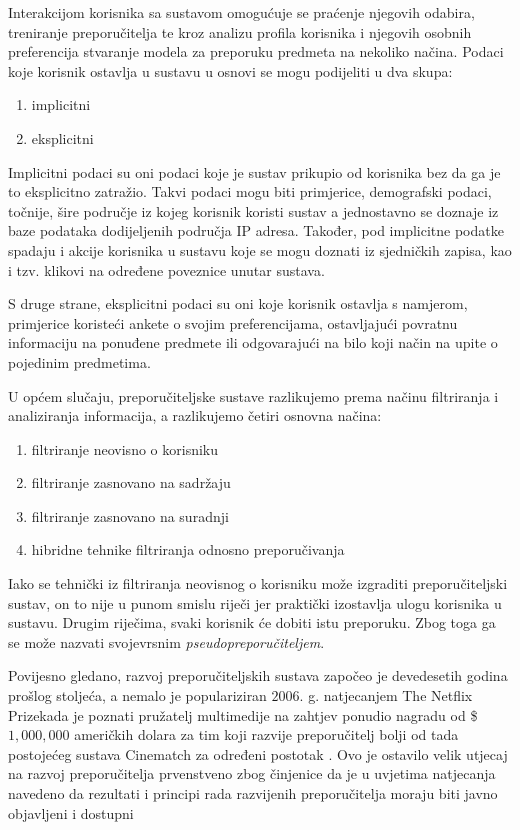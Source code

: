 \documentclass[times, utf8, diplomski, numeric]{fer}
\begin{document}
Interakcijom korisnika sa sustavom omogućuje se praćenje njegovih odabira,
treniranje preporučitelja te kroz analizu profila korisnika i njegovih osobnih
preferencija stvaranje modela za preporuku predmeta na nekoliko načina. Podaci
koje korisnik ostavlja u sustavu u osnovi se mogu podijeliti u dva skupa:
\begin{enumerate}
  \item implicitni
  \item eksplicitni
\end{enumerate}
Implicitni podaci su oni podaci koje je sustav prikupio od korisnika bez da ga
je to eksplicitno zatražio. Takvi podaci mogu biti primjerice, demografski
podaci, točnije, šire područje iz kojeg korisnik koristi sustav a jednostavno se
doznaje iz baze podataka dodijeljenih područja  IP adresa.
Također, pod implicitne podatke spadaju i akcije korisnika u sustavu koje se
mogu doznati iz sjedničkih zapisa, kao i tzv. klikovi na određene poveznice
unutar sustava.

S druge strane, eksplicitni podaci su oni koje korisnik ostavlja s namjerom,
primjerice koristeći ankete o svojim preferencijama, ostavljajući povratnu
informaciju na ponuđene predmete  ili odgovarajući na bilo
koji način na upite o pojedinim predmetima.

U općem slučaju, preporučiteljske sustave razlikujemo prema načinu filtriranja i
analiziranja informacija, a razlikujemo četiri osnovna načina:
\begin{enumerate}
  \item filtriranje neovisno o korisniku 
  \item filtriranje zasnovano na sadržaju 
  \item filtriranje zasnovano na suradnji 
  \item hibridne tehnike filtriranja odnosno preporučivanja
\end{enumerate}
Iako se tehnički iz filtriranja neovisnog o korisniku može izgraditi
preporučiteljski sustav, on to nije u punom smislu riječi jer praktički
izostavlja ulogu korisnika u sustavu. Drugim riječima, svaki korisnik će dobiti
istu preporuku. Zbog toga ga se može nazvati svojevrsnim
\emph{pseudopreporučiteljem}.

Povijesno gledano, razvoj preporučiteljskih sustava započeo je devedesetih
godina prošlog stoljeća, a nemalo je populariziran $2006$. g.
natjecanjem \glqq The Netflix Prize\grqq kada je poznati pružatelj multimedije
na zahtjev ponudio nagradu od \$$1,000,000$ američkih dolara za tim koji razvije
preporučitelj bolji od tada postojećeg sustava \glqq Cinematch \grqq za određeni
postotak \cite{Bennett2007}.
Ovo je ostavilo velik utjecaj na razvoj preporučitelja prvenstveno zbog
činjenice da je u uvjetima natjecanja navedeno da rezultati i principi rada
razvijenih preporučitelja moraju biti javno objavljeni i dostupni
\end{document}
